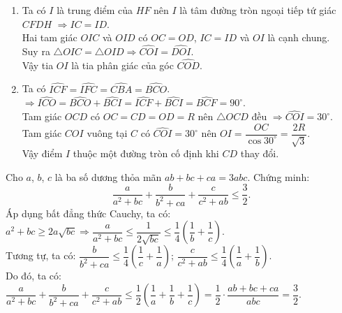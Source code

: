 \begin{ex}
{\begin{enumerate}
        		Mà $\widehat{CDH} = \widehat{CBA}$ (cùng chắn cung $AC$ trong đường tròn $(O)$) $\Rightarrow \widehat{CFH} = \widehat{CBA}$.\\
        		Hai tam giác $CHF$ và $CAB$ có $\widehat{HCF} = \widehat{ACB} = 90^\circ$ và $\widehat{CFH} = \widehat{CBA}$.\\
        		$\Rightarrow \triangle CHF \backsim \triangle CAB \Rightarrow \dfrac{CH}{CA} = \dfrac{CF}{CB} \Rightarrow CF.CA=CH.CB$.
        \item Ta có $I$ là trung điểm của $HF$ nên $I$ là tâm đường tròn ngoại tiếp tứ giác $CFDH$ $\Rightarrow IC = ID$.\\
        		Hai tam giác $OIC$ và $OID$ có $OC=OD$, $IC=ID$ và $OI$ là cạnh chung.\\
        		Suy ra $\triangle OIC = \triangle OID \Rightarrow \widehat{COI} = \widehat{DOI}$.\\
        		Vậy tia $OI$ là tia phân giác của góc $\widehat{COD}$.
        \item Ta có $\widehat{ICF}=\widehat{IFC}=\widehat{CBA}=\widehat{BCO}$.\\
        		$\Rightarrow \widehat{ICO}=\widehat{BCO}+\widehat{BCI}=\widehat{ICF}+\widehat{BCI}=\widehat{BCF}=90^\circ$.\\
        		Tam giác $OCD$ có $OC=CD=OD=R$ nên $\triangle OCD$ đều $\Rightarrow \widehat{COI}=30^\circ$.\\
        		Tam giác $COI$ vuông tại $C$ có $\widehat{COI}=30^\circ$ nên $OI=\dfrac{OC}{\cos 30^\circ}=\dfrac{2R}{\sqrt{3}}$.\\
        		Vậy điểm $I$ thuộc một đường tròn cố định khi $CD$ thay đổi.
    \end{enumerate}
    }
\end{ex}

\begin{ex}%
    Cho $a$, $b$, $c$ là ba số dương thỏa mãn $ab+bc+ca=3abc$. Chứng minh: $$\dfrac{a}{a^2+bc}+\dfrac{b}{b^2+ca}+\dfrac{c}{c^2+ab}\leq \dfrac{3}{2}.$$
\loigiai
    {
    Áp dụng bất đẳng thức Cauchy, ta có:\\
    $a^2+bc \geq 2a\sqrt{bc} \Rightarrow \dfrac{a}{a^2+bc} \leq \dfrac{1}{2\sqrt{bc}} \leq \dfrac{1}{4}\left(\dfrac{1}{b}+\dfrac{1}{c}\right)$.\\
    Tương tự, ta có: $\dfrac{b}{b^2+ca} \leq \dfrac{1}{4}\left(\dfrac{1}{c}+\dfrac{1}{a}\right)$; $\dfrac{c}{c^2+ab} \leq \dfrac{1}{4}\left(\dfrac{1}{a}+\dfrac{1}{b}\right)$.\\
    Do đó, ta có: $\dfrac{a}{a^2+bc}+\dfrac{b}{b^2+ca}+\dfrac{c}{c^2+ab}\leq \dfrac{1}{2}\left(\dfrac{1}{a}+\dfrac{1}{b}+\dfrac{1}{c}\right)=\dfrac{1}{2}\cdot \dfrac{ab+bc+ca}{abc}=\dfrac{3}{2}$.
    }
\end{ex}

